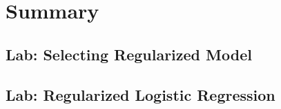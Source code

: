 \section{Summary}
\subsection{Lab: Selecting Regularized Model}
\subsection{Lab: Regularized Logistic Regression}